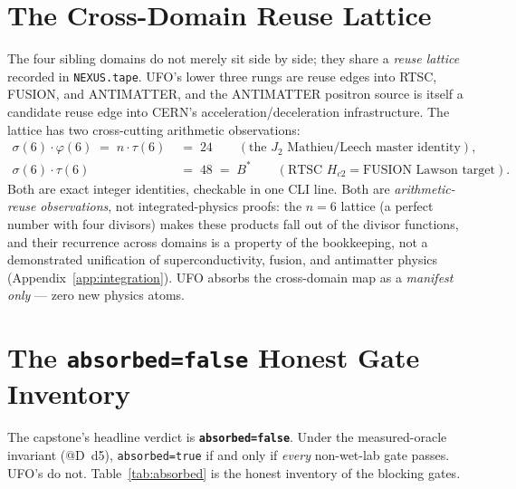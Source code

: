 \documentclass[11pt,a4paper]{article}
\begin{document}
\section{The Cross-Domain Reuse Lattice}
\label{sec:lattice}

The four sibling domains do not merely sit side by side; they share a
\emph{reuse lattice} recorded in \texttt{NEXUS.tape}. UFO's lower three
rungs are reuse edges into RTSC, FUSION, and ANTIMATTER, and the
ANTIMATTER positron source is itself a candidate reuse edge into CERN's
acceleration/deceleration infrastructure. The lattice has two cross-cutting
arithmetic observations:
\begin{align}
\sigma(6)\!\cdot\!\varphi(6) \;=\; n\!\cdot\!\tau(6) \;&=\; 24
  \qquad(\text{the } J_2 \text{ Mathieu/Leech master identity}), \\
\sigma(6)\!\cdot\!\tau(6) \;&=\; 48 \;=\; B^{*}
  \qquad(\text{RTSC } H_{c2} = \text{FUSION Lawson target}).
\end{align}
Both are exact integer identities, checkable in one CLI line. Both are
\emph{arithmetic-reuse observations}, not integrated-physics proofs: the
$n\!=\!6$ lattice (a perfect number with four divisors) makes these
products fall out of the divisor functions, and their recurrence across
domains is a property of the bookkeeping, not a demonstrated unification
of superconductivity, fusion, and antimatter physics
(Appendix~\ref{app:integration}). UFO absorbs the cross-domain map as a
\emph{manifest only} --- zero new physics atoms.

\section{The \texttt{absorbed=false} Honest Gate Inventory}
\label{sec:absorbed}

The capstone's headline verdict is \textbf{\texttt{absorbed=false}}.
Under the measured-oracle invariant (@D~d5), \texttt{absorbed=true} if
and only if \emph{every} non-wet-lab gate passes. UFO's do not.
Table~\ref{tab:absorbed} is the honest inventory of the blocking gates.
\end{document}
